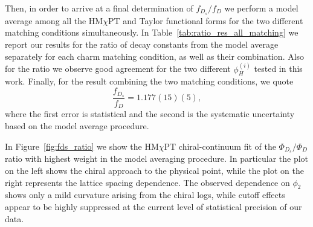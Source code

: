 Then, in order to arrive at a final determination of $f_{D_s}/f_D$ we perform a model average among all the HM$\chi$PT and Taylor functional forms for the two different matching conditions simultaneously. In Table~\ref{tab:ratio_res_all_matching} we report our results for the
ratio of decay constants from the model average separately for each charm matching
condition, as well as their combination. Also for the ratio we observe good agreement for the two different $\phi_H^{(i)}$ tested in this work. 
Finally, for the  result combining the two matching conditions, we quote 
\begin{equation}
	\frac{f_{D_s}}{f_D} = 1.177(15)(5),
\end{equation}
where  the first error is  statistical and the second is the systematic uncertainty based on  the model average procedure. 

In Figure~\ref{fig:fds_ratio} we show the HM$\chi$PT chiral-continuum fit of the 
$\Phi_{D_s}/\Phi_D$ ratio with highest weight in the model averaging procedure. In particular the plot on the left shows the chiral approach to the physical point, 
while the plot on the right represents the lattice spacing dependence.
The observed dependence on $\phi_2$ shows only a mild curvature arising from the chiral logs, while cutoff effects appear to be highly suppressed at the current level of statistical precision of our data.

